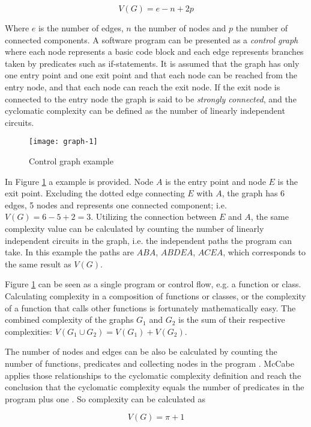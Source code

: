 $$
V(G) = e - n + 2p
$$

Where $e$ is the number of edges, $n$ the number of nodes and $p$ the number of
connected components. A software program can be presented as a \textit{control
graph} where each node represents a basic code block and each edge represents
branches taken by predicates such as if-statements. It is assumed that the
graph has only one entry point and one exit point and that each node can be
reached from the entry node, and that each node can reach the exit node. If the
exit node is connected to the entry node the graph is said to be
\textit{strongly connected}, and the cyclomatic complexity can be defined as
the number of linearly independent circuits. \cite{mccabe1976complexity}

\begin{figure}[h]
  \texttt{[image: graph-1]}
  \centering
  \caption{Control graph example}
  \label{fig:graph_1}
\end{figure}

In Figure \ref{fig:graph_1} a example is provided. Node $A$ is the entry point
and node $E$ is the exit point. Excluding the dotted edge connecting $E$ with
$A$, the graph has 6 edges, 5 nodes and represents one connected component;
i.e. $V(G) = 6 - 5 + 2 = 3$. Utilizing the connection between $E$ and $A$, the
same complexity value can be calculated by counting the number of linearly
independent circuits in the graph, i.e. the independent paths the program can
take. In this example the paths are $ABA$, $ABDEA$, $ACEA$, which corresponds
to the same result as $V(G)$.

Figure \ref{fig:graph_1} can be seen as a single program or control flow, e.g.
a function or class. Calculating complexity in a composition of functions or
classes, or the complexity of a function that calls other functions is
fortunately mathematically easy. The combined complexity of the graphs $G_1$
and $G_2$ is the sum of their respective complexities: $V(G_1 \cup G_2) =
V(G_1) + V(G_2)$. \cite{mccabe1976complexity}

The number of nodes and edges can be also be calculated by counting the number
of functions, predicates and collecting nodes in the program
\cite{mills1972mathematical}.  McCabe applies those relationships to the
cyclomatic complexity definition and reach the conclusion that the cyclomatic
complexity equals the number of predicates in the program plus one
\cite{mccabe1976complexity}. So complexity can be calculated as

$$
V(G) = \pi + 1
$$

